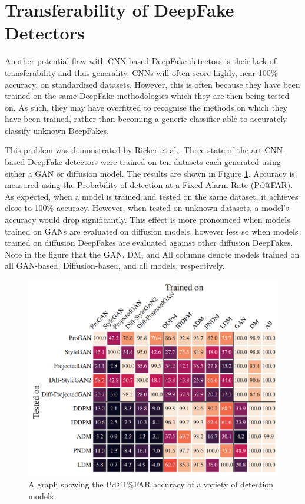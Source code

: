 \section{Transferability of DeepFake Detectors}


Another potential flaw with CNN-based DeepFake detectors is their lack of transferability\cite{ricker2022towards} and thus generality. CNNs will often score highly, near 100\% accuracy, on standardised datasets. However, this is often because they have been trained on the same DeepFake methodologies which they are then being tested on. As such, they may have overfitted to recognise the methods on which they have been trained, rather than becoming a generic classifier able to accurately classify unknown DeepFakes.

This problem was demonstrated by Ricker et al.\cite{ricker2022towards}. Three state-of-the-art CNN-based DeepFake detectors were trained on ten datasets each generated using either a GAN or diffusion model. The results are shown in Figure \ref{fig:transferability}. Accuracy is measured using the Probability of detection at a Fixed Alarm Rate (Pd@FAR). As expected, when a model is trained and tested on the same dataset, it achieves close to 100\% accuracy. However, when tested on unknown datasets, a model's accuracy would drop significantly. This effect is more pronounced when models trained on GANs are evaluated on diffusion models, however less so when models trained on diffusion DeepFakes are evaluated against other diffusion DeepFakes. Note in the figure that the GAN, DM, and All columns denote models trained on all GAN-based, Diffusion-based, and all models, respectively.

\begin{figure}[H]
    \centering
    \includegraphics[width=0.75\linewidth]{dissertation//figures/transferability.png}
    \caption{A graph showing the Pd@1\%FAR accuracy of a variety of detection models\cite{ricker2022towards}}
    \label{fig:transferability}
\end{figure}

